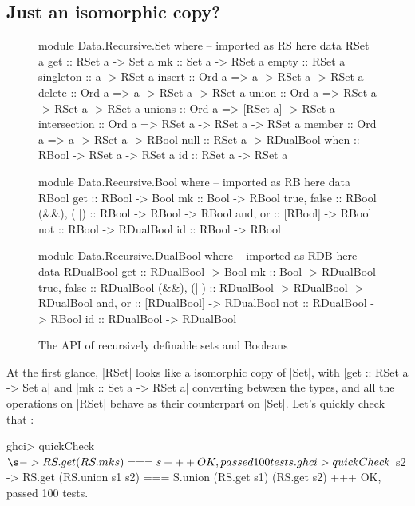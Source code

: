 \documentclass[manuscript,review,screen,acmsmall]{acmart}
\begin{document}
\subsection{Just an isomorphic copy?}

\afterpage{\clearpage}
\begin{figure}[p]
\begin{code}
module Data.Recursive.Set where       -- imported as RS here
  data RSet a
  get           ::           RSet a ->            Set a
  mk            ::           Set a ->             RSet a
  empty         ::                                RSet a
  singleton     ::           a ->                 RSet a
  insert        :: Ord a =>  a -> RSet a ->       RSet a
  delete        :: Ord a =>  a -> RSet a ->       RSet a
  union         :: Ord a =>  RSet a -> RSet a ->  RSet a
  unions        :: Ord a =>  [RSet a] ->          RSet a
  intersection  :: Ord a =>  RSet a -> RSet a ->  RSet a
  member        :: Ord a =>  a -> RSet a ->       RBool
  null          ::           RSet a ->            RDualBool
  when          ::           RBool -> RSet a ->   RSet a
  id            ::           RSet a ->            RSet a

module Data.Recursive.Bool where      -- imported as RB here
  data RBool
  get          :: RBool ->           Bool
  mk           :: Bool ->            RBool
  true, false  ::                    RBool
  (&&), (||)   :: RBool -> RBool ->  RBool
  and, or      :: [RBool] ->         RBool
  not          :: RBool ->           RDualBool
  id           :: RBool ->           RBool

module Data.Recursive.DualBool where  -- imported as RDB here
  data RDualBool
  get          ::  RDualBool ->               Bool
  mk           ::  Bool ->                    RDualBool
  true, false  ::                             RDualBool
  (&&), (||)   ::  RDualBool -> RDualBool ->  RDualBool
  and, or      ::  [RDualBool] ->             RDualBool
  not          ::  RDualBool ->               RBool
  id           ::  RDualBool ->               RDualBool
\end{code}
\caption{The API of recursively definable sets and Booleans}\label{fig:api}
\end{figure}

At the first glance, |RSet| looks like a isomorphic copy of |Set|, with |get :: RSet a -> Set a| and |mk :: Set a -> RSet a| converting between the types, and all the operations on |RSet| behave as their counterpart on |Set|. Let's quickly check that \citep{quickcheck}:
\begin{code}
ghci> quickCheck $ \s -> RS.get (RS.mk s) === s
+++ OK, passed 100 tests.
ghci> quickCheck $  s2 -> RS.get (RS.union s1 s2) === S.union (RS.get s1) (RS.get s2)
+++ OK, passed 100 tests.
\end{code}
\end{document}
